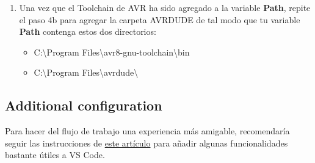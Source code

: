\documentclass[10pt,letterpaper]{article}
\begin{document}
\begin{enumerate}
\begin{enumerate}
\begin{enumerate}
        \end{enumerate}
    \end{enumerate}
    \item Una vez que el Toolchain de AVR ha sido agregado a la variable \textbf{Path}, repite el paso 4b para agregar la carpeta AVRDUDE de tal modo que tu variable \textbf{Path} contenga estos dos directorios:
    \begin{itemize}
        \item {\color{ForestGreen}C:\textbackslash Program Files\textbackslash avr8-gnu-toolchain\textbackslash bin}
        \item {\color{ForestGreen}C:\textbackslash Program Files\textbackslash avrdude\textbackslash}
    \end{itemize}
\end{enumerate}

\subsection{Additional configuration}
Para hacer del flujo de trabajo una experiencia más amigable, recomendaría seguir las instrucciones de \href{https://www.tonymitchell.ca/posts/use-vscode-with-avr-toolchain/}{este artículo} para añadir algunas funcionalidades bastante útiles a VS Code.
\end{document}
